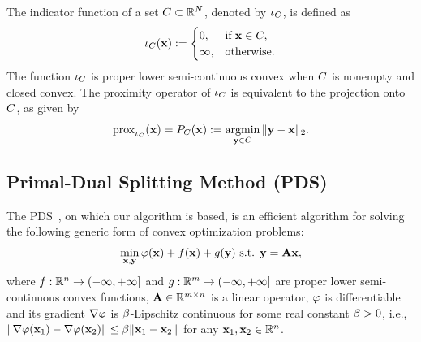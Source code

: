 The indicator function of a set $C \subset \mathbb{R}^{N}$, denoted by $\iota_{C}$, is defined as 
\begin{equation}
	\label{eq:Indicator_Function}
	\iota_{C} (\mathbf{x}) := 
	\begin{cases}
		0, & \mathrm{if} \: \mathbf{x} \in C, \\
		\infty, & \mathrm{otherwise}.
	\end{cases}
\end{equation}
The function $\iota_{C}$ is proper lower semi-continuous convex when $C$ is nonempty and closed convex.
The proximity operator of $\iota_{C}$ is equivalent to the projection onto $C$, as given by
\begin{equation}
	\label{eq:Projection}
	\operatorname{prox}_{\iota_{C}} (\mathbf{x}) = P_{C}(\mathbf{x}) := \mathop{\mathrm{argmin}}\limits_{\mathbf{y} \in C} \|\mathbf{y} - \mathbf{x} \|_{2}.
\end{equation}


\subsection{Primal-Dual Splitting Method (PDS)}
\label{subsec:PDS}
The PDS~\cite{Chambolle2011PDS, Condat2013PDS}, on which our algorithm is based, is an efficient algorithm for solving the following generic form of convex optimization problems:
\begin{equation}
	\label{prob:convex_optim_prob}
	\min_{\mathbf{x}, \mathbf{y}} \varphi (\mathbf{x}) + f (\mathbf{x}) + g (\mathbf{y}) \text{ s.t. } \mathbf{y} = \mathbf{A} \mathbf{x}, 
\end{equation}
where $f : \mathbb{R}^{n} \to (-\infty, +\infty]$ and $g : \mathbb{R}^{m} \to (-\infty, +\infty]$ are proper lower semi-continuous convex functions, $\mathbf{A} \in \mathbb{R}^{m \times  n}$ is a linear operator, $\varphi$ is differentiable and its gradient $\nabla \varphi$ is $\beta$-Lipschitz continuous for some real constant $\beta > 0$, i.e., $\| \nabla \varphi(\mathbf{x}_{1}) - \nabla \varphi(\mathbf{x}_{2}) \| \leq \beta \| \mathbf{x}_{1} - \mathbf{x}_{2} \|$ for any $\mathbf{x}_{1}, \mathbf{x}_{2} \in \mathbb{R}^{n}$.

